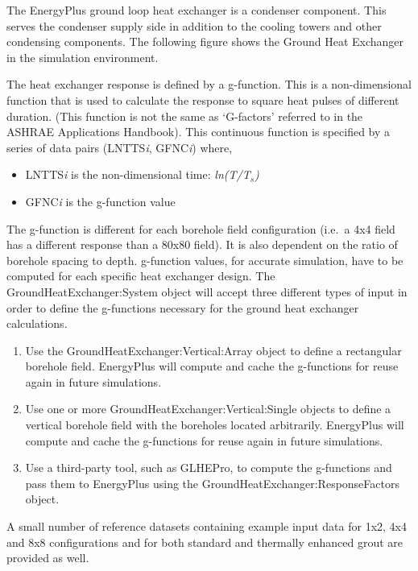 The EnergyPlus ground loop heat exchanger is a condenser component. This serves the condenser supply side in addition to the cooling towers and other condensing components. The following figure shows the Ground Heat Exchanger in the simulation environment.

The heat exchanger response is defined by a g-function. This is a non-dimensional function that is used to calculate the response to square heat pulses of different duration. (This function is not the same as `G-factors' referred to in the ASHRAE Applications Handbook). This continuous function is specified by a series of data pairs (LNTTS\emph{i}, GFNC\emph{i}) where,

\begin{itemize}
\item
  LNTTS\emph{i} is the non-dimensional time: \emph{ln(T/T\(_{s}\))}
\item
  GFNC\emph{i} is the g-function value
\end{itemize}

The g-function is different for each borehole field configuration (i.e.~a 4x4 field has a different response than a 80x80 field). It is also dependent on the ratio of borehole spacing to depth. g-function values, for accurate simulation, have to be computed for each specific heat exchanger design. The GroundHeatExchanger:System object will accept three different types of input in order to define the g-functions necessary for the ground heat exchanger calculations.

\begin{enumerate}
    \item Use the GroundHeatExchanger:Vertical:Array object to define a rectangular borehole field. EnergyPlus will compute and cache the g-functions for reuse again in future simulations.
    \item Use one or more GroundHeatExchanger:Vertical:Single objects to define a vertical borehole field with the boreholes located arbitrarily. EnergyPlus will compute and cache the g-functions for reuse again in future simulations.
    \item Use a third-party tool, such as GLHEPro, to compute the g-functions and pass them to EnergyPlus using the GroundHeatExchanger:ResponseFactors object.
\end{enumerate}

A small number of reference datasets containing example input data for 1x2, 4x4 and 8x8 configurations and for both standard and thermally enhanced grout are provided as well.

